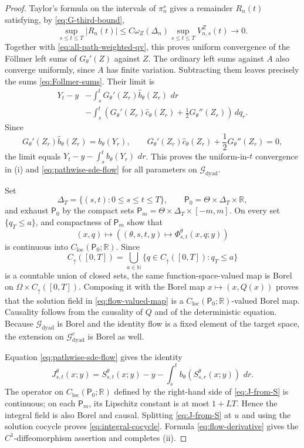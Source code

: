 \documentclass[10pt,a4paper]{amsart}
\newcommand{\N}{\mathbb N}
\newcommand{\R}{\mathbb R}
\newcommand{\abs}[1]{\left\lvert #1\right\rvert}
\newcommand{\cG}{\mathcal G}
\newcommand{\dd}{\,d}
\begin{document}
\begin{proof}
Taylor's formula on the intervals of \(\pi_n^s\) gives a remainder
\(R_n(t)\) satisfying, by \eqref{eq:G-third-bound},
\[
  \sup_{s\le t\le T}\abs{R_n(t)}
  \le
  C\omega_Z(\Delta_n)
   \sup_{s\le t\le T}V_{n,s}^Z(t)
  \longrightarrow0.
\]
Together with \eqref{eq:all-path-weighted-qv}, this proves uniform convergence
of the F\"ollmer left sums of \(G_\theta'(Z)\) against \(Z\).  The ordinary
left sums against \(A\) also converge uniformly, since \(A\) has finite
variation.  Subtracting them leaves precisely the sums
\eqref{eq:Follmer-sums}.  Their limit is
\begin{align*}
  Y_t-y
  &-\int_s^tG_\theta'(Z_r)\widehat b_\theta(Z_r)\,\dd r\\
  &-\int_s^t
    \left(
      G_\theta'(Z_r)\widehat c_\theta(Z_r)
      +\frac12G_\theta''(Z_r)
    \right)\dd q_r.
\end{align*}
Since
\[
  G_\theta'(Z_r)\widehat b_\theta(Z_r)
    =b_\theta(Y_r),
  \qquad
  G_\theta'(Z_r)\widehat c_\theta(Z_r)
    +\frac12G_\theta''(Z_r)=0,
\]
the limit equals \(Y_t-y-\int_s^t b_\theta(Y_r)\,\dd r\).  This proves the
uniform-in-\(t\) convergence in (i) and \eqref{eq:pathwise-sde-flow} for all
parameters on \(\cG_{\mathrm{dyad}}\).

Set
\[
  \Delta_T=\{(s,t):0\le s\le t\le T\},
  \qquad
  \mathsf P_0=\Theta\times\Delta_T\times\R,
\]
and exhaust \(\mathsf P_0\) by the compact sets
\(\mathsf P_m=\Theta\times\Delta_T\times[-m,m]\).  On every set
\(\{q_T\le a\}\),  and compactness of
\(\mathsf P_m\) show that
\[
  (x,q)\longmapsto
  \left(
    (\theta,s,t,y)\longmapsto\Phi_{s,t}^\theta(x,q;y)
  \right)
\]
is continuous into \(C_{\mathrm{loc}}(\mathsf P_0;\R)\).  Since
\[
  C_\uparrow([0,T])
  =\bigcup_{a\in\N}\{q\in C_\uparrow([0,T]):q_T\le a\}
\]
is a countable union of closed sets, the same function-space-valued map is
Borel on \(\Omega\times C_\uparrow([0,T])\).  Composing it with the Borel
map \(x\mapsto(x,Q(x))\) proves that the solution field in
\eqref{eq:flow-valued-map} is a
\(C_{\mathrm{loc}}(\mathsf P_0;\R)\)-valued Borel map.  Causality follows
from the causality of \(Q\) and of the deterministic equation.
Because \(\cG_{\mathrm{dyad}}\) is Borel and the identity flow is a fixed
element of the target space, the extension on \(\cG_{\mathrm{dyad}}^c\) is
Borel as well.

Equation \eqref{eq:pathwise-sde-flow} gives the identity
\begin{equation}\label{eq:J-from-S}
  J_{s,t}^\theta(x;y)
  =S_{s,t}^\theta(x;y)-y
   -\int_s^t b_\theta(S_{s,r}^\theta(x;y))\,\dd r.
\end{equation}
The operator on \(C_{\mathrm{loc}}(\mathsf P_0;\R)\) defined by the
right-hand side of \eqref{eq:J-from-S} is continuous; on each
\(\mathsf P_m\), its Lipschitz constant is at most \(1+LT\).  Hence the
integral field is also Borel and causal.  Splitting
\eqref{eq:J-from-S} at \(u\) and using the solution cocycle proves
\eqref{eq:integral-cocycle}.  Formula
\eqref{eq:flow-derivative} gives the \(C^1\)-diffeomorphism assertion and
completes (ii).


\end{proof}
\end{document}
